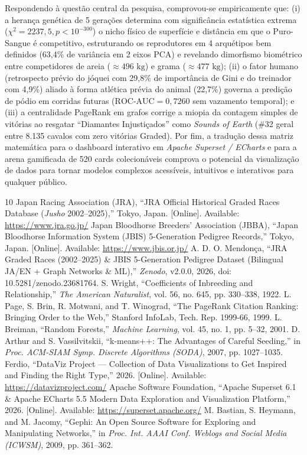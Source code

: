 \documentclass[conference]{IEEEtran}
\begin{document}
Respondendo à questão central da pesquisa, comprovou-se empiricamente que: (i) a herança genética de 5 gerações determina com significância estatística extrema ($\chi^2 = 2237,5, p < 10^{-300}$) o nicho físico de superfície e distância em que o Puro-Sangue é competitivo, estruturando os reprodutores em 4 arquétipos bem definidos (63,4\%
de variância em 2 eixos PCA) e revelando dimorfismo biométrico entre competidores de areia ($\approx 496\text{ kg}$) e grama ($\approx 477\text{ kg}$); (ii) o fator humano (retrospecto prévio do jóquei com 29,8\%
de importância de Gini e do treinador com 4,9\%)
aliado à forma atlética prévia do animal (22,7\%)
governa a predição de pódio em corridas futuras ($\text{ROC-AUC} = 0,7260$ sem vazamento temporal); e (iii) a centralidade PageRank em grafos corrige a miopia da contagem simples de vitórias ao resgatar ``Diamantes Injustiçados'' como \textit{Sounds of Earth} (\#32 geral entre 8.135 cavalos com zero vitórias Graded). Por fim, a tradução dessa matriz matemática para o dashboard interativo em \textit{Apache Superset / ECharts} e para a arena gamificada de 520 cards colecionáveis comprova o potencial da visualização de dados para tornar modelos complexos acessíveis, intuitivos e interativos para qualquer público.

\begin{thebibliography}{10}
 Japan Racing Association (JRA), ``JRA Official Historical Graded Races Database (\textit{Jusho} 2002--2025),'' Tokyo, Japan. [Online]. Available: \url{https://www.jra.go.jp/}
 Japan Bloodhorse Breeders' Association (JBBA), ``Japan Bloodhorse Information System (JBIS) 5-Generation Pedigree Records,'' Tokyo, Japan. [Online]. Available: \url{https://www.jbis.or.jp/}
 A. D. O. Mendonça, ``JRA Graded Races (2002--2025) \& JBIS 5-Generation Pedigree Dataset (Bilingual JA/EN + Graph Networks \& ML),'' \textit{Zenodo}, v2.0.0, 2026, doi: 10.5281/zenodo.23681764.
 S. Wright, ``Coefficients of Inbreeding and Relationship,'' \textit{The American Naturalist}, vol. 56, no. 645, pp. 330--338, 1922.
 L. Page, S. Brin, R. Motwani, and T. Winograd, ``The PageRank Citation Ranking: Bringing Order to the Web,'' Stanford InfoLab, Tech. Rep. 1999-66, 1999.
 L. Breiman, ``Random Forests,'' \textit{Machine Learning}, vol. 45, no. 1, pp. 5--32, 2001.
 D. Arthur and S. Vassilvitskii, ``k-means++: The Advantages of Careful Seeding,'' in \textit{Proc. ACM-SIAM Symp. Discrete Algorithms (SODA)}, 2007, pp. 1027--1035.
 Ferdio, ``DataViz Project --- Collection of Data Visualizations to Get Inspired and Finding the Right Type,'' 2026. [Online]. Available: \url{https://datavizproject.com/}
 Apache Software Foundation, ``Apache Superset 6.1 \& Apache ECharts 5.5 Modern Data Exploration and Visualization Platform,'' 2026. [Online]. Available: \url{https://superset.apache.org/}
 M. Bastian, S. Heymann, and M. Jacomy, ``Gephi: An Open Source Software for Exploring and Manipulating Networks,'' in \textit{Proc. Int. AAAI Conf. Weblogs and Social Media (ICWSM)}, 2009, pp. 361--362.
\end{thebibliography}
\end{document}
